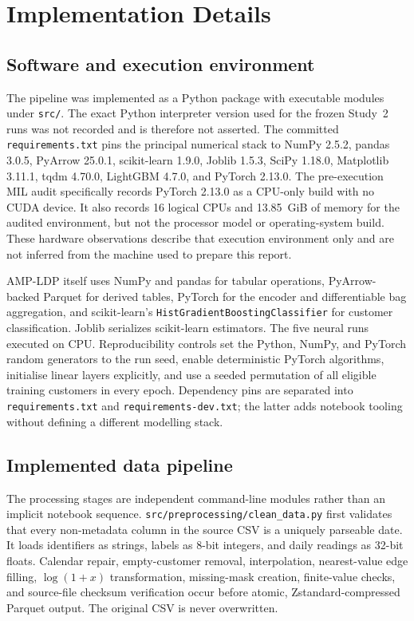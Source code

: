 \section{Implementation Details}\label{sec:implementation}

\subsection{Software and execution environment}

The pipeline was implemented as a Python package with executable modules under \texttt{src/}. The exact Python interpreter version used for the frozen Study~2 runs was not recorded and is therefore not asserted. The committed \texttt{requirements.txt} pins the principal numerical stack to NumPy 2.5.2, pandas 3.0.5, PyArrow 25.0.1, scikit-learn 1.9.0, Joblib 1.5.3, SciPy 1.18.0, Matplotlib 3.11.1, tqdm 4.70.0, LightGBM 4.7.0, and PyTorch 2.13.0. The pre-execution MIL audit specifically records PyTorch 2.13.0 as a CPU-only build with no CUDA device. It also records 16 logical CPUs and 13.85~GiB of memory for the audited environment, but not the processor model or operating-system build. These hardware observations describe that execution environment only and are not inferred from the machine used to prepare this report.

AMP-LDP itself uses NumPy and pandas for tabular operations, PyArrow-backed Parquet for derived tables, PyTorch for the encoder and differentiable bag aggregation, and scikit-learn's \texttt{HistGradientBoostingClassifier} for customer classification. Joblib serializes scikit-learn estimators. The five neural runs executed on CPU. Reproducibility controls set the Python, NumPy, and PyTorch random generators to the run seed, enable deterministic PyTorch algorithms, initialise linear layers explicitly, and use a seeded permutation of all eligible training customers in every epoch. Dependency pins are separated into \texttt{requirements.txt} and \texttt{requirements-dev.txt}; the latter adds notebook tooling without defining a different modelling stack.

\subsection{Implemented data pipeline}

The processing stages are independent command-line modules rather than an implicit notebook sequence. \texttt{src/preprocessing/clean\_data.py} first validates that every non-metadata column in the source CSV is a uniquely parseable date. It loads identifiers as strings, labels as 8-bit integers, and daily readings as 32-bit floats. Calendar repair, empty-customer removal, interpolation, nearest-value edge filling, $\log(1+x)$ transformation, missing-mask creation, finite-value checks, and source-file checksum verification occur before atomic, Zstandard-compressed Parquet output. The original CSV is never overwritten.

